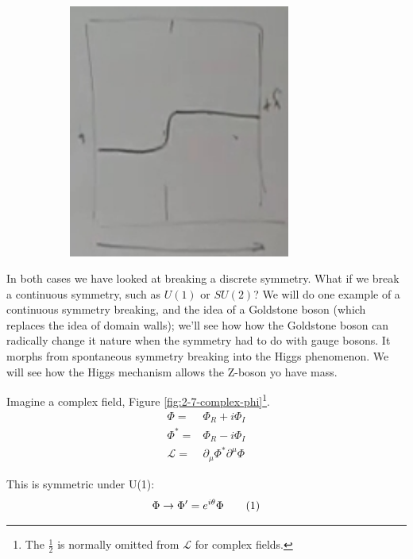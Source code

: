 \documentclass[]{article}
\newcommand\numberthis{\addtocounter{equation}{1}\tag{\theequation}}
\begin{document}
\begin{figure}[H]
\begin{subfigure}[t]{0.9\textwidth}
\begin{center}
			\includegraphics[width=0.8\textwidth]{2-7-V-domain-wall}
		\end{center}
	\end{subfigure}
\end{figure}

In both cases we have looked at breaking a discrete symmetry. What if we break a continuous symmetry, such as $U(1)$ or $SU(2)$? We will do one example of a continuous symmetry breaking, and the idea of a Goldstone boson (which replaces the idea of domain walls); we'll see how how the Goldstone boson can radically change it nature when the symmetry had to do with gauge bosons. It morphs from spontaneous symmetry breaking into the Higgs phenomenon. We will see how the Higgs mechanism allows the Z-boson yo have mass.


Imagine a complex field, Figure \ref{fig:2-7-complex-phi}\footnote{The $\frac{1}{2}$ is normally omitted from $\mathcal{L}$ for complex fields.}.
\begin{align*}
	\Phi =& \Phi_R + i \Phi_I \\
	\Phi^* =& \Phi_R - i \Phi_I\\
	\mathcal{L} =&  \partial_\mu \Phi^* \partial^\mu \Phi 
\end{align*}

This is symmetric under U(1):
\begin{align*}
	\Phi \rightarrow \Phi^\prime=e^{i \theta} \Phi  \numberthis \label{eq:U1:theta}
\end{align*}
\end{document}
